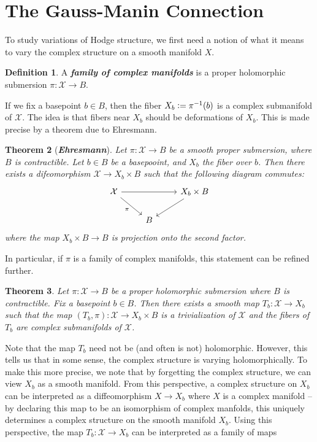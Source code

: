 \documentclass[psamsfonts, 12pt]{amsart}
\newtheorem{thm}{Theorem}[section]
\theoremstyle{definition}
\newtheorem{defn}[thm]{Definition}
\theoremstyle{remark}
\newcommand{\ib}[1]{\textbf{\textit{#1}}}
\newcommand{\inv}{^{-1}}
\newcommand{\defeq}{\vcentcolon=}
\begin{document}
\section{The Gauss-Manin Connection}
%
To study variations of Hodge structure, we first need a notion of what it means to vary
the complex structure on a smooth manifold $X$.
%
\begin{defn}
A \ib{family of complex manifolds} is a proper holomorphic submersion
$\pi : \mathcal{X} \to B$.
\end{defn}
%
If we fix a basepoint $b \in B$, then the fiber $X_b \defeq \pi\inv(b)$ is a
complex submanifold of $\mathcal{X}$. The idea is that fibers near $X_b$ should
be deformations of $X_b$. This is made precise by a theorem due to Ehresmann.
%
\begin{thm}[\ib{Ehresmann}]
Let $\pi : \mathcal{X} \to B$ be a smooth proper submersion, where $B$ is contractible.
Let $b \in B$ be a basepooint, and $X_b$ the fiber over $b$. Then there
exists a difeomorphism $\mathcal{X} \to X_b \times B$ such that the following
diagram commutes:
\[\begin{tikzcd}
\mathcal{X} \ar[dr, "\pi"']\ar[rr] && X_b \times B \ar[dl] \\
& B
\end{tikzcd}\]
where the map $X_b \times B \to B$ is projection onto the second factor.
\end{thm}
%
In particular, if $\pi$ is a family of complex manifolds, this statement
can be refined further.
%
\begin{thm}
Let $\pi : \mathcal{X} \to B$ be a proper holomorphic submersion where $B$ is
contractible. Fix a basepoint $b \in B$. Then there exists a smooth map
$T_b : \mathcal{X} \to X_b$ such that the map
$(T_b,\pi) : \mathcal{X} \to X_b \times B$ is a trivialization of $\mathcal{X}$ and
the fibers of $T_b$ are complex submanifolds of $\mathcal{X}$.
\end{thm}
%
Note that the map $T_b$ need not be (and often is not) holomorphic. However, this
tells us that in some sense, the complex structure is varying holomorphically. To
make this more precise, we note that by forgetting the complex structure, we can view
$X_b$ as a smooth manifold. From this perspective, a complex structure on $X_b$ can be
interpreted as a diffeomorphism $X \to X_b$ where $X$ is a complex manifold -- by
declaring this map to be an isomorphism of complex manfolds, this uniquely determines
a complex structure on the smooth manifold $X_b$. Using this perspective,
the map $T_b : \mathcal{X} \to X_b$ can be interpreted as a family of maps
\end{document}
